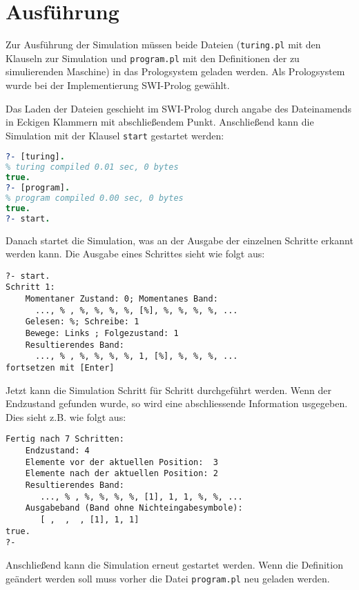\documentclass[final,a4paper,11pt,notitlepage,halfparskip]{scrreprt}
\begin{document}
\section{Ausführung}
Zur Ausführung der Simulation müssen beide Dateien (\texttt{turing.pl}
mit den Klauseln zur Simulation und \texttt{program.pl} mit den
Definitionen der zu simulierenden Maschine) in das Prologsystem geladen
werden. Als Prologsystem wurde bei der Implementierung SWI-Prolog
gewählt.  

Das Laden der Dateien geschieht im SWI-Prolog durch angabe des
Dateinamends in Eckigen Klammern mit abschließendem Punkt. Anschließend
kann die Simulation mit der Klausel \texttt{start} gestartet werden:
\begin{lstlisting}[language=Prolog]
?- [turing].
% turing compiled 0.01 sec, 0 bytes
true.
?- [program].
% program compiled 0.00 sec, 0 bytes
true.
?- start.
\end{lstlisting}
Danach startet die Simulation, was an der Ausgabe der einzelnen Schritte
erkannt werden kann. Die Ausgabe eines Schrittes sieht wie folgt aus:
\begin{lstlisting}[]
?- start.
Schritt 1:
    Momentaner Zustand: 0; Momentanes Band:
      ..., % , %, %, %, %, [%], %, %, %, %, ...
    Gelesen: %; Schreibe: 1
    Bewege: Links ; Folgezustand: 1
    Resultierendes Band: 
      ..., % , %, %, %, %, 1, [%], %, %, %, ...
fortsetzen mit [Enter]
\end{lstlisting}
Jetzt kann die Simulation Schritt für Schritt durchgeführt werden. Wenn
der Endzustand gefunden wurde, so wird eine abschliessende Information
usgegeben. Dies sieht z.B. wie folgt aus:
\begin{lstlisting}[]
Fertig nach 7 Schritten:
    Endzustand: 4
    Elemente vor der aktuellen Position:  3
    Elemente nach der aktuellen Position: 2
    Resultierendes Band:
       ..., % , %, %, %, %, [1], 1, 1, %, %, ...
    Ausgabeband (Band ohne Nichteingabesymbole):
       [ ,  ,  , [1], 1, 1]
true.
?- 
\end{lstlisting}
Anschließend kann die Simulation erneut gestartet werden. Wenn die
Definition geändert werden soll muss vorher die Datei
\texttt{program.pl} neu geladen werden.
\end{document}
